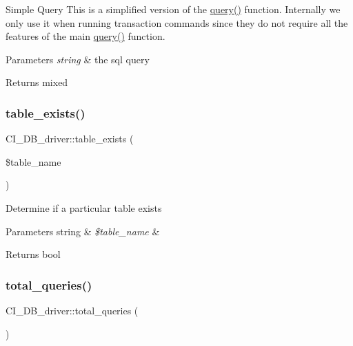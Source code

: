 Simple Query This is a simplified version of the \mbox{\hyperlink{class_c_i___d_b__driver_a0dec9a2b1896d1833e3d3698b519a9d0}{query()}} function. Internally we only use it when running transaction commands since they do not require all the features of the main \mbox{\hyperlink{class_c_i___d_b__driver_a0dec9a2b1896d1833e3d3698b519a9d0}{query()}} function.


\begin{DoxyParams}{Parameters}
{\em string} & the sql query \\
\hline
\end{DoxyParams}
\begin{DoxyReturn}{Returns}
mixed 
\end{DoxyReturn}
\mbox{\label{class_c_i___d_b__driver_a7d4503e6186f2df6c374e16cc786e50a}} 
\subsubsection{\texorpdfstring{table\+\_\+exists()}{table\_exists()}}
{\footnotesize\ttfamily C\+I\+\_\+\+D\+B\+\_\+driver\+::table\+\_\+exists (\begin{DoxyParamCaption}\item[{}]{\$table\+\_\+name }\end{DoxyParamCaption})}

Determine if a particular table exists


\begin{DoxyParams}[1]{Parameters}
string & {\em \$table\+\_\+name} & \\
\hline
\end{DoxyParams}
\begin{DoxyReturn}{Returns}
bool 
\end{DoxyReturn}
\mbox{\label{class_c_i___d_b__driver_a05110905de2b2e96a9af233b00a294a0}} 
\subsubsection{\texorpdfstring{total\+\_\+queries()}{total\_queries()}}
{\footnotesize\ttfamily C\+I\+\_\+\+D\+B\+\_\+driver\+::total\+\_\+queries (\begin{DoxyParamCaption}{ }\end{DoxyParamCaption})}

